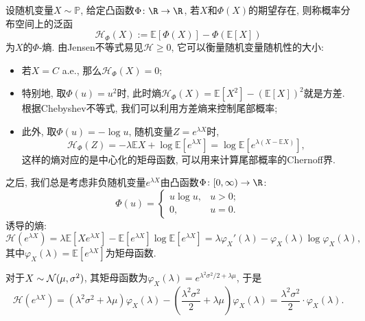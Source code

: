 设随机变量$X \sim \mathbb{P}$, 给定凸函数$\Phi \colon \R \to \R$, 若$X$和$\Phi(X)$的期望存在, 则称概率分布空间上的泛函
\begin{equation*}
	\mathcal{H}_\Phi(X) := \mathbb{E}[\Phi(X)] - \Phi(\mathbb{E}[X])  
\end{equation*}
为$X$的$\Phi$-熵.
由Jensen不等式易见$\mathcal{H} \geq 0$, 它可以衡量随机变量随机性的大小: 
\begin{itemize}
	\item 若$X = C$ a.e., 那么$\mathcal{H}_\Phi (X) = 0$; 
	\item 特别地, 取$\Phi(u) = u^2$时, 此时熵$\mathcal{H}_\Phi(X) = \mathbb{E}[X^2] - (\mathbb{E}[X])^2$就是方差. 根据Chebyshev不等式, 我们可以利用方差熵来控制尾部概率; 
	\item 此外, 取$\Phi(u) = - \log u$, 随机变量$Z = e^{\lambda X}$时, 
		\begin{equation*}
			\mathcal{H}_\Phi(Z) 
			= - \lambda \mathbb{E}X + \log \mathbb{E}[e^{\lambda X}] 
			= \log \mathbb{E}[e^{\lambda(X - \mathbb{E}X)}], 
		\end{equation*}
		这样的熵对应的是中心化的矩母函数, 可以用来计算尾部概率的Chernoff界. 
\end{itemize}
之后, 我们总是考虑非负随机变量$e^{\lambda X}$由凸函数$\Phi \colon [0, \infty) \to \R$: 
\begin{equation*}
	\Phi(u) = 
	\begin{cases}
		u \log u, & u > 0; \\ 0, & u = 0. 
	\end{cases}
\end{equation*}
诱导的熵: 
\begin{equation}\label{eq:EntropyByMGF}
	\mathcal{H}(e^{\lambda X}) 
	= \lambda \mathbb{E}[ X e^{\lambda X}] - \mathbb{E}[e^{\lambda X}] \log \mathbb{E}[e^{\lambda X}]
	= \lambda \varphi_X'(\lambda) - \varphi_X(\lambda) \log \varphi_X(\lambda), 
\end{equation}
其中$\varphi_X(\lambda) = \mathbb{E}[e^{\lambda X}]$为矩母函数. 

\begin{example}[Gauss随机变量的熵]
	对于$X \sim \mathcal{N}(\mu, \sigma^2)$, 其矩母函数为$\varphi_X(\lambda) = e^{\lambda^2 \sigma^2 / 2 + \lambda \mu}$, 于是
	\begin{equation}\label{eq:EntropyOfGaussianRV}
		\mathcal{H}(e^{\lambda X}) 
		= (\lambda^2 \sigma^2 + \lambda \mu) \varphi_X(\lambda) - \left(\frac{\lambda^2 \sigma^2}{2} + \lambda\mu\right) \varphi_X(\lambda) 
		= \frac{\lambda^2 \sigma^2}{2} \cdot \varphi_X(\lambda). 
	\end{equation}
\end{example}

